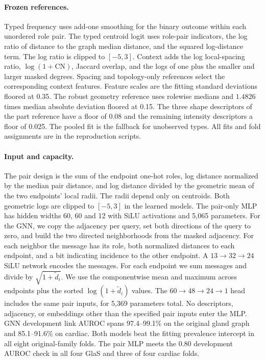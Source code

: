 \paragraph{Frozen references.}
Typed frequency uses add-one smoothing for the binary outcome within each unordered role pair. The typed centroid logit uses role-pair indicators, the log ratio of distance to the graph median distance, and the squared log-distance term. The log ratio is clipped to $[-5,3]$. Context adds the log local-spacing ratio, $\log(1+\mathrm{CN})$, Jaccard overlap, and the logs of one plus the smaller and larger masked degrees. Spacing and topology-only references select the corresponding context features. Feature scales are the fitting standard deviations floored at 0.35. The robust geometry reference uses rolewise medians and $1.4826$ times median absolute deviation floored at 0.15. The three shape descriptors of the part reference have a floor of 0.08 and the remaining intensity descriptors a floor of 0.025. The pooled fit is the fallback for unobserved types. All fits and fold assignments are in the reproduction scripts.

\paragraph{Input and capacity.}
The pair design is the sum of the endpoint one-hot roles, log distance normalized by the median pair distance, and log distance divided by the geometric mean of the two endpoints' local radii. The radii depend only on centroids. Both geometric logs are clipped to $[-5,3]$ in the learned models. The pair-only MLP has hidden widths 60, 60 and 12 with SiLU activations and 5,065 parameters. For the GNN, we copy the adjacency per query, set both directions of the query to zero, and build the two directed neighborhoods from the masked adjacency. For each neighbor the message has its role, both normalized distances to each endpoint, and a bit indicating incidence to the other endpoint. A $13\to32\to24$ SiLU network encodes the messages. For each endpoint we sum messages and divide by $\sqrt{1+\tilde d_i}$. We use the componentwise mean and maximum across endpoints plus the sorted $\log(1+\tilde d_i)$ values. The $60\to48\to24\to1$ head includes the same pair inputs, for 5,369 parameters total. No descriptors, adjacency, or embeddings other than the specified pair inputs enter the MLP. GNN development link AUROC spans 97.4--99.1\% on the original gland graph and 85.1--91.6\% on cardiac. Both models beat the fitting prevalence intercept in all eight original-family folds. The pair MLP meets the 0.80 development AUROC check in all four GlaS and three of four cardiac folds.

